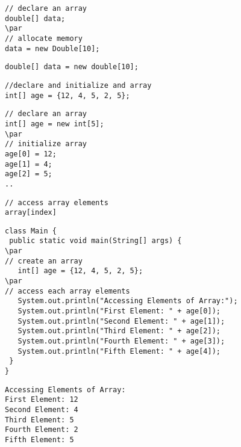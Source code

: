\documentclass{book}
\def\lthtmlcheckvsize{\ifdim\ht\sizebox<\vsize 
  \ifdim\wd\sizebox<\hsize\expandafter\hfill\fi \expandafter\vfill
  \else\expandafter\vss\fi}%
\begin{document}
{\newpage\clearpage
{}%
\begin{lstlisting}
// declare an array
double[] data;
\par
// allocate memory
data = new Double[10];
\end{lstlisting}%
\lthtmlfigureZ
\lthtmlcheckvsize\clearpage}

{\newpage\clearpage
{}%
\begin{lstlisting}
double[] data = new double[10];
\end{lstlisting}%
\lthtmlfigureZ
\lthtmlcheckvsize\clearpage}

{\newpage\clearpage
{}%
\begin{lstlisting}
//declare and initialize and array
int[] age = {12, 4, 5, 2, 5};
\end{lstlisting}%
\lthtmlfigureZ
\lthtmlcheckvsize\clearpage}

{\newpage\clearpage
{}%
\begin{lstlisting}
// declare an array
int[] age = new int[5];
\par
// initialize array
age[0] = 12;
age[1] = 4;
age[2] = 5;
..
\end{lstlisting}%
\lthtmlfigureZ
\lthtmlcheckvsize\clearpage}

{\newpage\clearpage
{}%
\begin{lstlisting}
// access array elements
array[index]
\end{lstlisting}%
\lthtmlfigureZ
\lthtmlcheckvsize\clearpage}

{\newpage\clearpage
{}%
\begin{lstlisting}
class Main {
 public static void main(String[] args) {
\par
// create an array
   int[] age = {12, 4, 5, 2, 5};
\par
// access each array elements
   System.out.println("Accessing Elements of Array:");
   System.out.println("First Element: " + age[0]);
   System.out.println("Second Element: " + age[1]);
   System.out.println("Third Element: " + age[2]);
   System.out.println("Fourth Element: " + age[3]);
   System.out.println("Fifth Element: " + age[4]);
 }
}
\end{lstlisting}%
\lthtmlfigureZ
\lthtmlcheckvsize\clearpage}

{\newpage\clearpage
{}%
\begin{lstlisting}
Accessing Elements of Array:
First Element: 12
Second Element: 4
Third Element: 5
Fourth Element: 2
Fifth Element: 5
\end{lstlisting}%
\lthtmlfigureZ
\lthtmlcheckvsize\clearpage}
\end{document}
